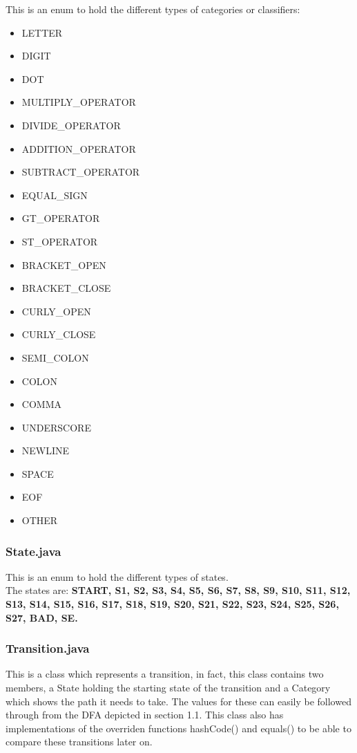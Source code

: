\documentclass{article}
\begin{document}
					This is an enum to hold the different types of categories or classifiers:
					\begin{itemize}
						\item LETTER
						\item DIGIT
						\item DOT
			    			\item MULTIPLY\_OPERATOR
			    			\item DIVIDE\_OPERATOR
			    			\item ADDITION\_OPERATOR
			    			\item SUBTRACT\_OPERATOR
						\item EQUAL\_SIGN
			    			\item GT\_OPERATOR  
						\item ST\_OPERATOR
			    			\item BRACKET\_OPEN  
						\item BRACKET\_CLOSE
			    			\item CURLY\_OPEN
						\item CURLY\_CLOSE
			    			\item SEMI\_COLON
			    			\item COLON
			    			\item COMMA
			    			\item UNDERSCORE
			    			\item NEWLINE
			    			\item SPACE
			    			\item EOF
			    			\item OTHER
					\end{itemize}
					
				      \subsubsection{State.java}
					
					This is an enum to hold the different types of states.\\
					The states are: \textbf{START, S1, S2, S3, S4, S5, S6, S7, S8, S9, S10, S11, S12, S13, S14, S15, S16, S17, S18, S19, S20, S21, S22, S23, S24, S25, S26, S27, BAD, SE.}
					
					\subsubsection{Transition.java}
					
					This is a class which represents a transition, in fact, this class contains two members, a State holding the starting state of the transition and a Category which shows the path it needs to take. The values for these can easily be followed through from the DFA depicted in section 1.1. This class also has implementations of the overriden functions hashCode() and equals() to be able to compare these transitions later on.
			
\end{document}

